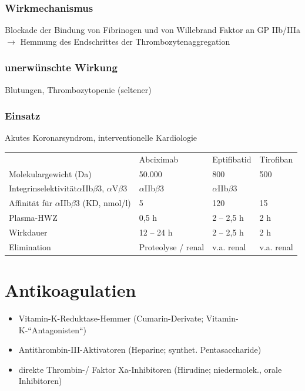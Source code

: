 \documentclass[10pt,a4paper]{report}
\begin{document}
\subsubsection{Wirkmechanismus} %
\label{par:wirkmechanismus}
Blockade der Bindung von Fibrinogen und von Willebrand Faktor an GP IIb/IIIa $\rightarrow$ Hemmung des Endschrittes der Thrombozytenaggregation
\subsubsection{unerwünschte Wirkung} %
\label{par:unerw_nschte_wirkung}
Blutungen, Thrombozytopenie (seltener)
\subsubsection{Einsatz} %
\label{par:einsatz}
Akutes Koronarsyndrom, interventionelle Kardiologie \\
\begin{tabularx}{\textwidth}{XXXX}
&Abciximab&Eptifibatid&Tirofiban\\
Molekulargewicht (Da)&50.000&800&500\\
Integrinselektivität$\alpha$IIb$\beta$3, $\alpha$V$\beta$3&$\alpha$IIb$\beta$3&$\alpha$IIb$\beta$3\\
Affinität für $\alpha$IIb$\beta$3 (KD, nmol/l)&5&120&15\\
Plasma-HWZ&0,5 h&2 – 2,5 h&2 h\\
Wirkdauer&12 – 24 h&2 – 2,5 h&2 h\\
Elimination&Proteolyse / renal&v.a. renal&v.a. renal\\
\end{tabularx}
\section{Antikoagulatien} %
\label{sec:section_name}
\begin{itemize}
	\item Vitamin-K-Reduktase-Hemmer (Cumarin-Derivate; Vitamin-K-“Antagonisten“)
	\item Antithrombin-III-Aktivatoren (Heparine; synthet. Pentasaccharide)
	\item direkte Thrombin-/ Faktor Xa-Inhibitoren (Hirudine; niedermolek., orale Inhibitoren)
\end{itemize}
\end{document}
